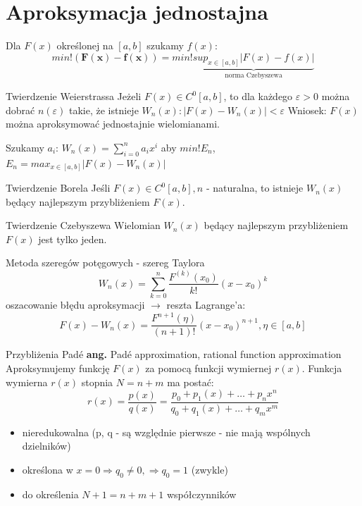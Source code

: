 \section{Aproksymacja jednostajna}
\begin{frame}
	Dla $F(x)$ określonej na $[a,b]$ szukamy $f(x)$:
    $$min! (\mathbf{F(x)-f(x)}) = min!\underbrace{sup_{x \in [a,b]}|F(x)-f(x)|}_{\text{norma Czebyszewa}}$$
\end{frame}
\begin{frame}
	\begin{block}{Twierdzenie Weierstrassa}
	Jeżeli $F(x) \in C^0[a,b]$, to dla każdego $\varepsilon>0$ można dobrać $n(\varepsilon)$ takie, że istnieje $W_n(x): |F(x)-W_n(x)|<\varepsilon$ \newline
    \newline Wniosek: $F(x)$ można aproksymować jednostajnie wielomianami.
	\end{block}
    Szukamy $a_i$:\newline
    $W_n(x) = \sum_{i=0}^{n}a_ix^i$ aby $min!E_n$, \newline
    $E_n = max_{x \in [a,b]} |F(x) - W_n(x)|$
\end{frame}
\begin{frame}
	\begin{block}{Twierdzenie Borela}
		Jeśli $F(x)\in C^0[a,b], n$ - naturalna, to istnieje $W_n(x)$ będący najlepszym przybliżeniem $F(x)$.
	\end{block}
    \begin{block}{Twierdzenie Czebyszewa}
    	Wielomian $W_n(x)$ będący najlepszym przybliżeniem $F(x)$ jest tylko jeden.
    \end{block}
\end{frame}
\begin{frame}{Metoda szeregów potęgowych - szereg Taylora}
	$$W_n(x) = \sum_{k=0}^{n}\frac{F^{(k)}(x_0)}{k!}(x-x_0)^k$$
    oszacowanie błędu aproksymacji $\rightarrow$ reszta Lagrange'a:
    $$F(x)-W_n(x) = \frac{F^{n+1}(\eta)}{(n+1)!}(x-x_0)^{n+1},\eta \in [a,b]$$
\end{frame}
\begin{frame}{Przybliżenia Padé}
	\textbf{ang.} Padé approximation, rational function approximation \newline
    \newline
    Aproksymujemy funkcję $F(x)$ za pomocą funkcji wymiernej $r(x)$.
    \newline
    Funkcja wymierna $r(x)$ stopnia $N = n+m$ ma postać:
    $$r(x) = \frac{p(x)}{q(x)} = \frac{p_0+p_1(x)+\ldots+p_nx^n}{q_0+q_1(x)+\ldots+q_mx^m}$$
    \begin{itemize}
    \item nieredukowalna (p, q - są względnie pierwsze - nie mają wspólnych dzielników)
    \item określona w $x=0\Rightarrow q_0 \not = 0, \Rightarrow q_0=1$ (zwykle)
    \item do określenia $N+1 = n+m+1$ współczynników
    \end{itemize}
\end{frame}
